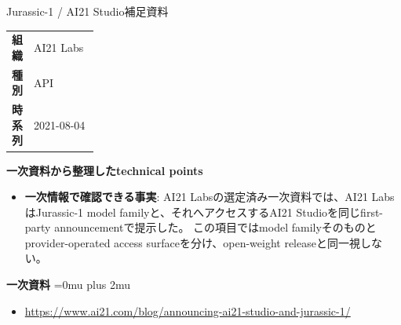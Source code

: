 \begin{technicalnote}{Jurassic-1 / AI21 Studio}{補足資料}
\begingroup
\begin{tabularx}{\linewidth}{@{}>{\bfseries}p{0.22\linewidth}X@{}}
組織 & AI21 Labs \\
種別 & API \\
時系列 & 2021-08-04 \\
\end{tabularx}
\smallskip
{\bfseries 一次資料から整理したtechnical points}
\begin{itemize}[leftmargin=1.5em,itemsep=0.35em]
\item \textbf{一次情報で確認できる事実}: AI21 Labsの選定済み一次資料では、AI21 LabsはJurassic-1 model familyと、それへアクセスするAI21 Studioを同じfirst-party announcementで提示した。 この項目ではmodel familyそのものとprovider-operated access surfaceを分け、open-weight releaseと同一視しない。
\end{itemize}
\begin{minipage}{\linewidth}
\begin{samepage}
{\bfseries 一次資料}
\begingroup\sloppy
\Urlmuskip=0mu plus 2mu\relax
\begin{itemize}[leftmargin=1.5em,itemsep=0.25em]
\item {\scriptsize\url{https://www.ai21.com/blog/announcing-ai21-studio-and-jurassic-1/}}
\end{itemize}
\endgroup
\end{samepage}
\end{minipage}
\endgroup
\end{technicalnote}
\medskip
